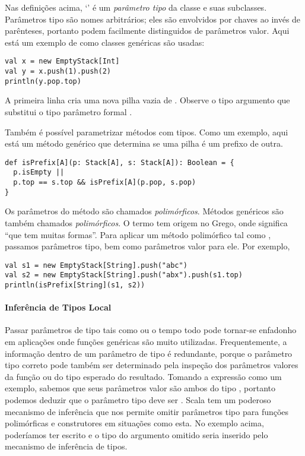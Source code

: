 Nas definições acima, `' é um {\em parâmetro tipo} da classe
 e suas subclasses. Parâmetros tipo são nomes arbitrários; eles
são envolvidos por chaves ao invés de parênteses, portanto podem facilmente 
distinguidos de parâmetros valor. Aqui está um exemplo de como classes genéricas
são usadas:

\begin{lstlisting}
val x = new EmptyStack[Int]
val y = x.push(1).push(2)
println(y.pop.top)
\end{lstlisting}
A primeira linha cria uma nova pilha vazia de . Observe o tipo argumento 
\code{[Int]} que substitui o tipo parâmetro formal .

Também é possível parametrizar métodos com tipos. Como um exemplo, aqui está um
método genérico que determina se uma pilha é um prefixo de outra.
\begin{lstlisting}
def isPrefix[A](p: Stack[A], s: Stack[A]): Boolean = {
  p.isEmpty ||
  p.top == s.top && isPrefix[A](p.pop, s.pop)
}
\end{lstlisting}

Os parâmetros do método são chamados {\em polimórficos}. Métodos genéricos são
também chamados {\em polimórficos}. O termo tem origem no Grego, onde 
significa ``que tem muitas formas''. Para aplicar um método polimórfico tal como 
, passamos parâmetros tipo, bem como parâmetros valor para ele. 
Por exemplo,  

\begin{lstlisting}
val s1 = new EmptyStack[String].push("abc")
val s2 = new EmptyStack[String].push("abx").push(s1.top)
println(isPrefix[String](s1, s2))
\end{lstlisting}


\paragraph{Inferência de Tipos Local}
Passar parâmetros de tipo tais como \code{[Int]} ou \code{[String]} o
tempo todo pode tornar-se enfadonho em aplicações onde funções 
genéricas são muito utilizadas. Frequentemente, a informação dentro
de um parâmetro de tipo é redundante, porque o parâmetro tipo correto
pode também ser determinado pela inspeção dos parâmetros valores da 
função ou do tipo esperado do resultado. Tomando a expressão 
 como um exemplo, sabemos que seus
parâmetros valor são ambos do tipo , portanto 
podemos deduzir que o parâmetro tipo deve ser . Scala 
tem um poderoso mecanismo de inferência que nos permite omitir 
parâmetros tipo para funções polimórficas e construtores em 
situações como esta. No exemplo acima, poderíamos ter escrito
 e o tipo do argumento omitido \code{[String]}
seria inserido pelo mecanismo de inferência de tipos.

